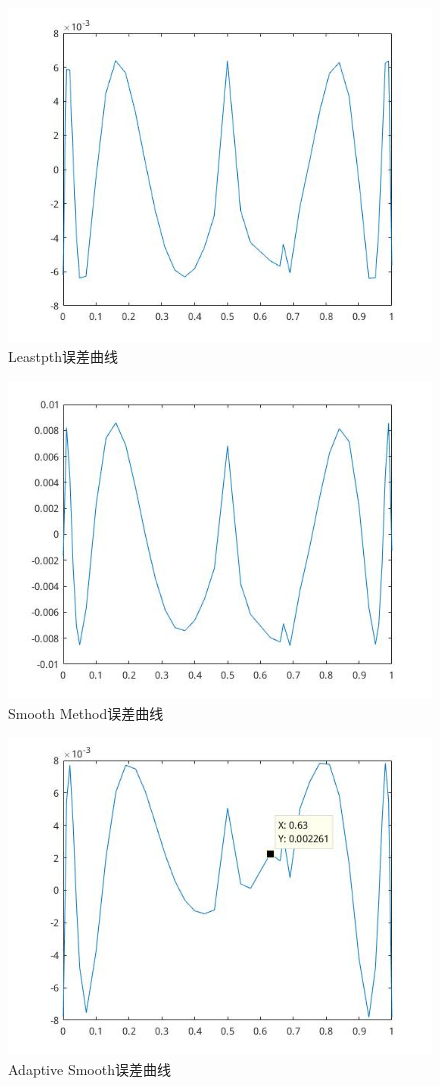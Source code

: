 \documentclass{ctexart}
\begin{document}
\begin{figure}[htpb]
	\centering
	\includegraphics[width=0.8\linewidth]{pic/leastpth.jpg}
	\caption{Leastpth误差曲线}
	\label{fig:leastpth}
\end{figure}
\begin{figure}[htpb]
	\centering
	\includegraphics[width=0.8\linewidth]{pic/xusmooth.jpg}
	\caption{Smooth Method误差曲线}
	\label{fig:xusmooth}
\end{figure}
\begin{figure}[htpb]
	\centering
	\includegraphics[width=0.8\linewidth]{pic/adasmooth.jpg}
	\caption{Adaptive Smooth误差曲线}
	\label{fig:adasmooth}
\end{figure}
\end{document}
